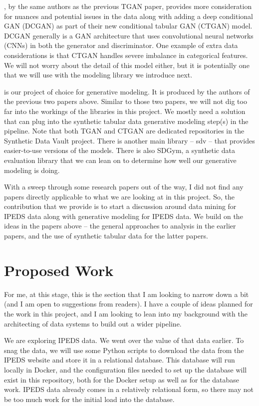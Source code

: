 \documentclass[sigconf, authorversion, nonacm]{acmart}
\begin{document}
    \cite{DBLP:journals/corr/abs-1907-00503}, by the same authors as the previous TGAN paper, provides more consideration for nuances and potential issues in the data along with adding a deep conditional GAN (DCGAN) as part of their new conditional tabular GAN (CTGAN) model. DCGAN generally is a GAN architecture that uses convolutional neural networks (CNNs) in both the generator and discriminator. One example of extra data considerations is that CTGAN handles severe imbalance in categorical features. We will not worry about the detail of this model either, but it is potentially one that we will use with the modeling library we introduce next.

    \cite{sdv} is our project of choice for generative modeling. It is produced by the authors of the previous two papers above. Similar to those two papers, we will not dig too far into the workings of the libraries in this project. We mostly need a solution that can plug into the synthetic tabular data generative modeling step(s) in the pipeline. Note that both TGAN and CTGAN are dedicated repositories in the Synthetic Data Vault project. There is another main library -- sdv -- that provides easier-to-use versions of the models. There is also SDGym, a synthetic data evaluation library that we can lean on to determine how well our generative modeling is doing.

    With a sweep through some research papers out of the way, I did not find any papers directly applicable to what we are looking at in this project. So, the contribution that we provide is to start a discussion around data mining for IPEDS data along with generative modeling for IPEDS data. We build on the ideas in the papers above -- the general approaches to analysis in the earlier papers, and the use of synthetic tabular data for the latter papers.

\section{Proposed Work}
    For me, at this stage, this is the section that I am looking to narrow down a bit (and I am open to suggestions from readers). I have a couple of ideas planned for the work in this project, and I am looking to lean into my background with the architecting of data systems to build out a wider pipeline.

    We are exploring IPEDS data. We went over the value of that data earlier. To snag the data, we will use some Python scripts to download the data from the IPEDS website and store it in a relational database. This database will run locally in Docker, and the configuration files needed to set up the database will exist in this repository, both for the Docker setup as well as for the database work. IPEDS data already comes in a relatively relational form, so there may not be too much work for the initial load into the database.
\end{document}
